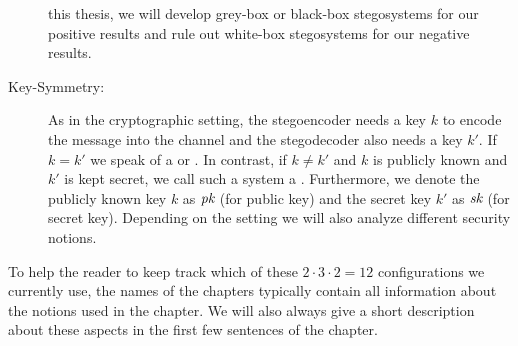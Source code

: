 \begin{description}
  this thesis, we will develop grey-box or black-box stegosystems for
  our positive results and rule out white-box stegosystems for our
  negative results.
\item[Key-Symmetry:] As in the cryptographic setting, the stegoencoder
  needs a key $k$ to encode the message into the channel  and the
  stegodecoder also needs a key $k'$. If $k=k'$ we speak of a
   or . In contrast, if $k\neq k'$ and $k$ is publicly known
  and $k'$ is kept secret, we call such a system a
  . Furthermore, we denote the
  publicly known key $k$ as $\textit{pk}$ (for public key) and the secret key
  $k'$ as $\textit{sk}$ (for secret key). Depending on the setting we will also
  analyze different security notions. 
\end{description}

To help the reader to keep track which of these $2\cdot 3\cdot 2=12$
configurations we currently use, the names of the chapters typically
contain all information about the notions used in the chapter. We will
also always give a short description about these aspects in the first
few sentences of the chapter.

